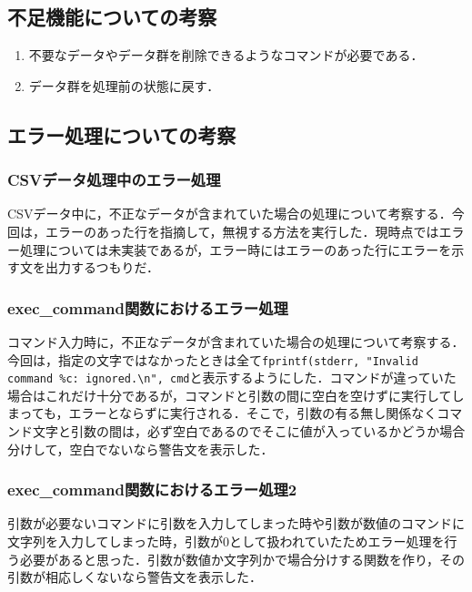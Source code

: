 \documentclass[a4j,11pt]{jarticle}
\begin{document}
\subsection{不足機能についての考察}
\begin{enumerate}
\item 不要なデータやデータ群を削除できるようなコマンドが必要である．

\item データ群を処理前の状態に戻す．
\end{enumerate}

\subsection{エラー処理についての考察}
\subsubsection{CSVデータ処理中のエラー処理}
CSVデータ中に，不正なデータが含まれていた場合の処理について考察する．今回は，エラーのあった行を指摘して，無視する方法を実行した．現時点ではエラー処理については未実装であるが，エラー時にはエラーのあった行にエラーを示す文を出力するつもりだ． 

\subsubsection{exec\_command関数におけるエラー処理}
コマンド入力時に，不正なデータが含まれていた場合の処理について考察する．今回は，指定の文字ではなかったときは全て\verb|fprintf(stderr, "Invalid command %c: ignored.\n", cmd|と表示するようにした．コマンドが違っていた場合はこれだけ十分であるが，コマンドと引数の間に空白を空けずに実行してしまっても，エラーとならずに実行される．そこで，引数の有る無し関係なくコマンド文字と引数の間は，必ず空白であるのでそこに値が入っているかどうか場合分けして，空白でないなら警告文を表示した．

\subsubsection{exec\_command関数におけるエラー処理2}
引数が必要ないコマンドに引数を入力してしまった時や引数が数値のコマンドに文字列を入力してしまった時，引数が$0$として扱われていたためエラー処理を行う必要があると思った．引数が数値か文字列かで場合分けする関数を作り，その引数が相応しくないなら警告文を表示した．
\end{document}
